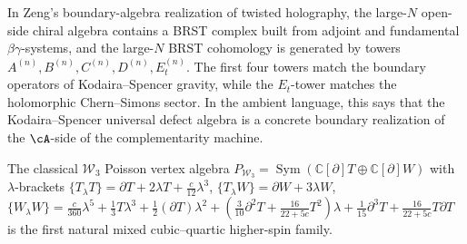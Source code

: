 \begin{example}
In Zeng's boundary-algebra realization of twisted holography, the
large-$N$ open-side chiral algebra contains a BRST complex built
from adjoint and fundamental $\beta\gamma$-systems, and the
large-$N$ BRST cohomology is generated by towers
$A^{(n)}, B^{(n)}, C^{(n)}, D^{(n)}, E_t^{(n)}$.
The first four towers match the boundary operators of
Kodaira--Spencer gravity, while the $E_t$-tower matches the
holomorphic Chern--Simons sector. In the ambient language, this
says that the Kodaira--Spencer universal defect algebra is a
concrete boundary realization of the $\cA$-side of the
complementarity machine.
\end{example}

\begin{example}
The classical $\mathcal{W}_3$ Poisson vertex algebra
$P_{\mathcal{W}_3} = \operatorname{Sym}(\mathbb{C}[\partial]T
\oplus \mathbb{C}[\partial]W)$ with $\lambda$-brackets
$\{T_\lambda T\} = \partial T + 2\lambda T
+ \frac{c}{12}\lambda^3$,
$\{T_\lambda W\} = \partial W + 3\lambda W$,
$\{W_\lambda W\} = \frac{c}{360}\lambda^5 + \frac13 T\lambda^3
+ \frac12(\partial T)\lambda^2
+ (\frac{3}{10}\partial^2 T + \frac{16}{22+5c}T^2)\lambda
+ \frac{1}{15}\partial^3 T + \frac{16}{22+5c}T\partial T$
is the first natural mixed cubic--quartic higher-spin family.
\end{example}

